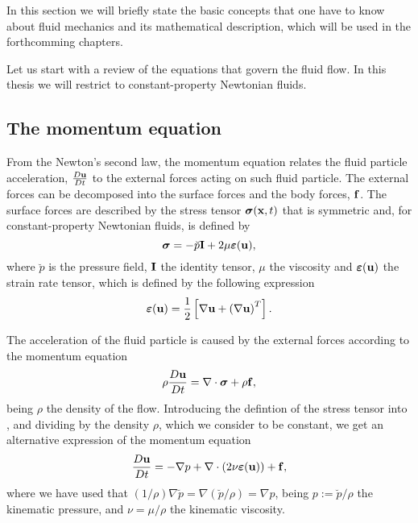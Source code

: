 In this section we will briefly state the basic concepts that one have to know about fluid mechanics and its mathematical description, which will be used in the forthcomming chapters.

Let us start with a review of the equations that govern the fluid flow. In this thesis we will restrict to constant-property Newtonian fluids. 

\subsection{The momentum equation}
\label{subsec-momentum}
From the Newton's second law, the momentum equation relates the fluid particle acceleration, $\frac{D{\bf u}}{Dt}$ to the external forces acting on such fluid particle. The external forces can be decomposed into the surface forces and the body forces, ${\bf f}$. The surface forces are described by the stress tensor $\boldsymbol{\sigma}({\bf x},t)$ that is symmetric and, for constant-property Newtonian fluids, is defined by
\begin{equation}
\label{eq-stress_tensor_def}
\boldsymbol{\sigma} = -\breve{p}\mathbf{I} + 2\mu\boldsymbol{\varepsilon}({\bf u}), 
\end{equation}
where $\breve{p}$ is the pressure field, $\mathbf{I}$ the identity tensor, $\mu$ the viscosity and $\boldsymbol{\varepsilon}({\bf u})$ the strain rate tensor, which is defined by the following expression
\begin{equation}
\label{eq-strain_tensor_def}
\boldsymbol{\varepsilon}({\bf u})=\frac{1}{2}\left[\nabla{\bf u}+\left(\nabla{\bf u}\right)^T\right].
\end{equation}

The acceleration of the fluid particle is caused by the external forces according to the momentum equation
\begin{equation}
\label{eq-momentum_equation_def1}
\rho\frac{D{\bf u}}{Dt}=\nabla\cdot\boldsymbol{\sigma}+\rho{\bf f},
\end{equation}
being $\rho$ the density of the flow. Introducing the defintion of the stress tensor  into , and dividing by the density $\rho$, which we consider to be constant, we get an alternative expression of the momentum equation
\begin{equation}
\label{eq-momentum_equation_def2}
\frac{D{\bf u}}{Dt}=-\nabla p+\nabla\cdot(2\nu\boldsymbol{\varepsilon}({\bf u}))+{\bf f},
\end{equation}
where we have used that $(1/\rho)\nabla\breve{p}=\nabla(\breve{p}/\rho)=\nabla p$, being $p:=\breve{p}/\rho$ the kinematic pressure, and $\nu=\mu/\rho$ the kinematic viscosity.

